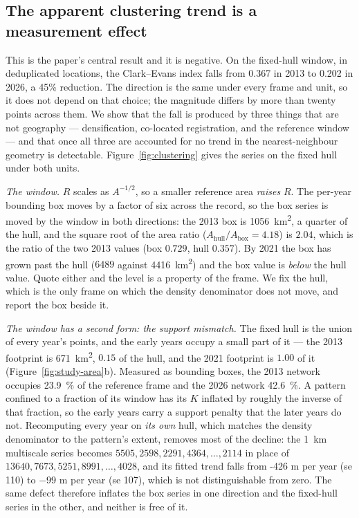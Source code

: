 \documentclass{article}
\newcommand{\locHullDrop}{45}
\newcommand{\rHullLocFirst}{0.367}
\newcommand{\rHullLocLast}{0.202}
\newcommand{\lKmExact}{-426}
\begin{document}
\subsection{The apparent clustering trend is a measurement effect}
\label{sec:results-trend}

This is the paper's central result and it is negative. On the fixed-hull window, in
deduplicated locations, the Clark--Evans index falls from \rHullLocFirst{} in 2013 to
\rHullLocLast{} in 2026, a \locHullDrop\% reduction. The direction is the same under every
frame and unit, so it does not depend on that choice; the magnitude differs by more than
twenty points across them. We show that the fall is produced by three things that are not
geography --- densification, co-located registration, and the reference window --- and that once
all three are accounted for no trend in the nearest-neighbour geometry is detectable.
Figure~\ref{fig:clustering} gives the series on the fixed hull under both units.

\noindent\emph{The window.} $R$ scales as $A^{-1/2}$, so a smaller reference area \emph{raises}
$R$. The per-year bounding box moves by a factor of six across the record, so the box series is
moved by the window in both directions: the 2013 box is \SI{1056}{\kilo\meter\squared}, a quarter
of the hull, and the square root of the area ratio ($A_{\text{hull}}/A_{\text{box}} = 4.18$) is
$2.04$, which is the ratio of the two 2013 values (box $0.729$, hull $0.357$). By 2021 the box has
grown past the hull ($6489$ against \SI{4416}{\kilo\meter\squared}) and the box value is
\emph{below} the hull value. Quote either and the level is a property of the frame. We fix the
hull, which is the only frame on which the density denominator does not move, and report the box
beside it.

\noindent\emph{The window has a second form: the support mismatch.} The fixed hull is the union
of every year's points, and the early years occupy a small part of it --- the 2013 footprint is
\SI{671}{\kilo\meter\squared}, $0.15$ of the hull, and the 2021 footprint is $1.00$ of it
(Figure~\ref{fig:study-area}b). Measured as bounding boxes, the 2013 network occupies
\SI{23.9}{\percent} of the reference frame and the 2026 network \SI{42.6}{\percent}. A
pattern confined to a fraction of its window has its $K$ inflated by roughly the inverse of that
fraction, so the early years carry a support penalty that the later years do not. Recomputing
every year on \emph{its own} hull, which matches the density denominator to the pattern's extent,
removes most of the decline: the \SI{1}{\kilo\meter} multiscale series becomes
$5505, 2598, 2291, 4364, \dots, 2114$ in place of $13640, 7673, 5251, 8991, \dots, 4028$, and its
fitted trend falls from \lKmExact{} m per year (se \num{110}) to \num{-99} m per year
(se \num{107}), which is not distinguishable from zero. The same defect therefore inflates the
box series in one direction and the fixed-hull series in the other, and neither is free of it.
\end{document}

